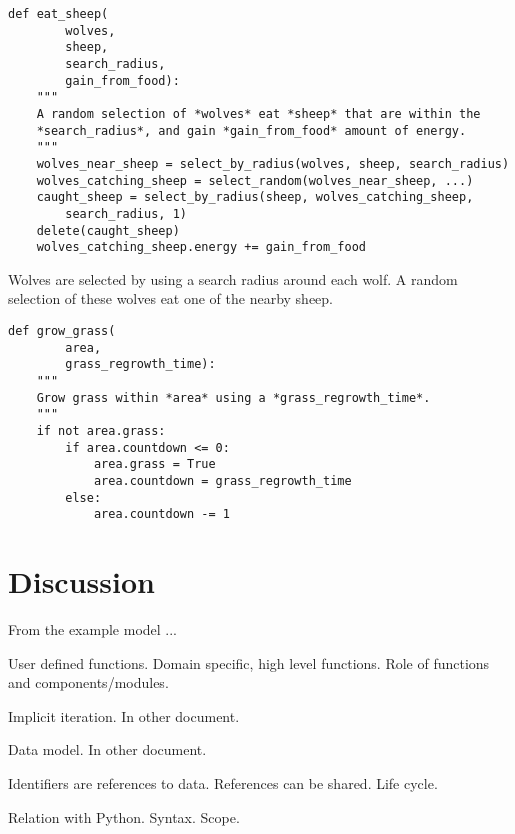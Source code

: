 \documentclass[10pt, a4paper]{article}
\begin{document}
\begin{lstlisting}
def eat_sheep(
        wolves,
        sheep,
        search_radius,
        gain_from_food):
    """
    A random selection of *wolves* eat *sheep* that are within the
    *search_radius*, and gain *gain_from_food* amount of energy.
    """
    wolves_near_sheep = select_by_radius(wolves, sheep, search_radius)
    wolves_catching_sheep = select_random(wolves_near_sheep, ...)
    caught_sheep = select_by_radius(sheep, wolves_catching_sheep,
        search_radius, 1)
    delete(caught_sheep)
    wolves_catching_sheep.energy += gain_from_food
\end{lstlisting}

Wolves are selected by using a search radius around each wolf. A random selection of these wolves eat one of the nearby sheep.

\begin{lstlisting}
def grow_grass(
        area,
        grass_regrowth_time):
    """
    Grow grass within *area* using a *grass_regrowth_time*.
    """
    if not area.grass:
        if area.countdown <= 0:
            area.grass = True
            area.countdown = grass_regrowth_time
        else:
            area.countdown -= 1
\end{lstlisting}

% 

\section{Discussion}
From the example model ...

User defined functions. Domain specific, high level functions. Role of functions and components/modules.

Implicit iteration. In other document.

Data model. In other document.

Identifiers are references to data. References can be shared. Life cycle.

Relation with Python. Syntax. Scope.
\end{document}
